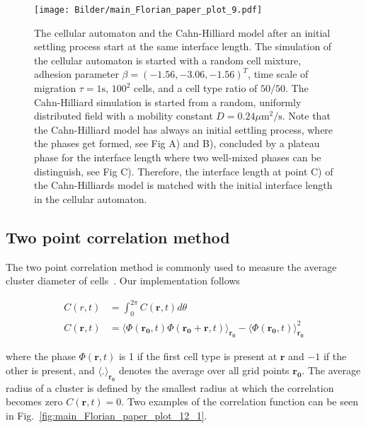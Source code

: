 \documentclass[10pt,letterpaper]{article}
\newcommand{\figref}[1]{Fig.~\ref{fig:#1}}
\begin{document}
\begin{figure}[ht!]
 \centering
 \texttt{[image: Bilder/main\_Florian\_paper\_plot\_9.pdf]}
 \caption{The cellular automaton and the Cahn-Hilliard model after an initial
 settling process start at the same interface length. The simulation
 of the cellular automaton is started with a random cell mixture, adhesion
 parameter $\textbf{$\beta$}=(-1.56, -3.06, -1.56)^T$, time scale of
 migration $\tau=1\text{s}$, $100^2$ cells, and a cell type ratio of $50/50$.
 The Cahn-Hilliard simulation is started from a random, uniformly distributed field
 with a mobility constant $D=0.24\mu\text{m}^2/\text{s}$. Note that the
 Cahn-Hilliard model has always an initial settling process, where the
 phases get formed, see Fig A) and B), concluded by a plateau phase for the interface
 length where two well-mixed phases can be distinguish, see Fig C). Therefore,
 the interface length at point C) of the Cahn-Hilliards
 model is matched with the initial interface length in the cellular automaton.}
 \label{fig:main_Florian_paper_plot_9}
\end{figure}

\subsection*{Two point correlation method}

The two point correlation method is commonly used to measure the
average cluster diameter of cells~\cite{MehMonNemVic2012, NakIsh2011}.
Our implementation follows

\begin{equation}
  \label{eq:2pointcorr}
  \begin{split}
    C(r,t) &= \int_0^{2\pi}C(\textbf{r},t)d\theta \\
    C(\textbf{r},t) &= \langle \Phi(\textbf{r}_\textbf{0},t) \Phi(\textbf{r}_\textbf{0} + \textbf{r},t)
    \rangle_{\textbf{r}_\textbf{0}} - \langle
    \Phi(\textbf{r}_\textbf{0},t) \rangle^2_{\textbf{r}_\textbf{0}}
  \end{split}
\end{equation}

where the phase $\Phi(\textbf{r},t)$ is 1 if the first cell type is
present at $\textbf{r}$ and $-1$ if the other is present,
and $\langle\text{.} \rangle_{\textbf{r}_\textbf{0}}$ denotes the
average over all grid points $\textbf{r}_\textbf{0}$. The average
radius of a cluster is defined by the smallest radius at which the
correlation becomes zero $C(\textbf{r},t)=0$. Two examples of the
correlation function can be seen in \figref{main_Florian_paper_plot_12_1}.
\end{document}
